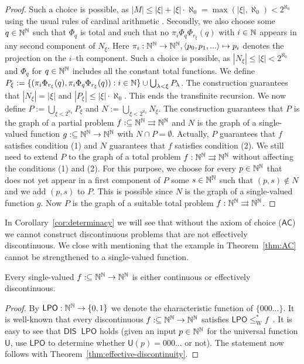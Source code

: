\documentclass{amsart}
\def\IN{{\Bbb{N}}}
\def\In{\subseteq}
\def\mto{\rightrightarrows}
\def\U{{\mathsf{{U}}}}
\def\LPO{\mathsf{LPO}}
\def\leqSW{\mathop{\leq_{\mathrm{sW}}}}
\def\leqSW{\mathop{\leq_{\mathrm{sW}}}}
\def\DIS{\mathsf{DIS}}
\def\AC{\mathsf{AC}}
\begin{document}
\begin{proof}
Such a choice is possible, as $|M|\leq |\xi|+|\xi|\cdot\aleph_0=\max(|\xi|,\aleph_0)<2^{\aleph_0}$ using
the usual rules of cardinal arithmetic \cite[Corollary~3.7.8]{Dev93}.
Secondly, we also choose some $q\in\IN^\IN$ such that $\Phi_q$ is total and such that no $\pi_i\Phi_q\Phi_{r_\xi}(q)$ with $i\in\IN$ 
appears in any second component of $N_\xi$.
Here $\pi_i:\IN^\IN\to\IN^\IN,\langle p_0,p_1,...\rangle\mapsto p_i$ denotes the projection
on the $i$--th component.
Such a choice is possible, as $|N_\xi|\leq|\xi|<2^{\aleph_0}$ and $\Phi_q$ for $q\in\IN^\IN$
includes all the constant total functions.
We define
$P_\xi:=\{(\pi_i\Phi_{r_\xi}(q),\pi_i\Phi_q\Phi_{r_\xi}(q)):i\in\IN\}\cup\bigcup_{\lambda<\xi}P_\lambda$.
 The construction guarantees that $|N_\xi|=|\xi|$ and $|P_\xi|\leq|\xi|\cdot\aleph_0$.
This ends the transfinite recursion.
We now define $P:=\bigcup_{\xi<2^{\aleph_0}}P_\xi$ and $N:=\bigcup_{\xi<2^{\aleph_0}}N_\xi$.
The construction guarantees that $P$ is the graph of a partial problem $f:\In\IN^\IN\mto\IN^\IN$
and $N$ is the graph of a single-valued function $g:\In\IN^\IN\to\IN^\IN$ with $N\cap P=\emptyset$.
Actually, $P$ guarantees that $f$ satisfies condition (1) and $N$ guarantees that $f$ satisfies condition (2).
We still need to extend $P$ to the graph of a total problem $f:\IN^\IN\mto\IN^\IN$ without affecting the conditions (1) and (2). 
For this purpose, we choose for every
$p\in\IN^\IN$ that does not yet appear in a first component of $P$ some $s\in\IN^\IN$ such that
$(p,s)\not\in N$ and we add $(p,s)$ to $P$. This is possible since $N$ is the graph of a single-valued function $g$.
Now $P$ is the graph of a suitable total problem $f:\IN^\IN\mto\IN^\IN$.
\end{proof}

In Corollary~\ref{cor:determinacy} we will see that without the axiom of choice ($\AC$) we cannot construct
discontinuous problems that are not effectively discontinuous.
We close with mentioning that the example in Theorem~\ref{thm:AC} cannot be strengthened to
a single-valued function.

\begin{proposition}
\label{prop:discontinuous}
Every single-valued ${f:\In\IN^\IN\to\IN^\IN}$ is either continuous or effectively discontinuous.
\end{proposition}
\begin{proof}
By $\LPO:\IN^\IN\to\{0,1\}$ we denote the characteristic function of $\{000...\}$. 
It is well-known that every discontinuous $f:\In\IN^\IN\to\IN^\IN$ satisfies $\LPO\leq_\mathrm{W}^*f$~\cite[Lemma~8.2.6]{Wei00}. It is easy to see that $\DIS\leqSW\LPO$ holds (given an input $p\in\IN^\IN$ for the universal function $\U$,
use $\LPO$ to determine whether $\U(p)=000...$ or not).
The statement now follows with Theorem~\ref{thm:effective-discontinuity}.
\end{proof}
\end{document}
